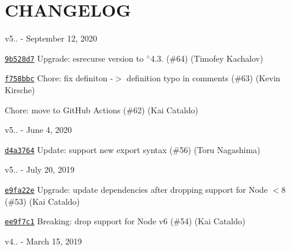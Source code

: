 \chapter{CHANGELOG}
\hypertarget{md_node__modules_2webpack_2node__modules_2eslint-scope_2CHANGELOG}{}\label{md_node__modules_2webpack_2node__modules_2eslint-scope_2CHANGELOG}
v5.. -\/ September 12, 2020


\begin{DoxyItemize}
\item \href{https://github.com/eslint/eslint-scope/commit/9b528d778c381718c12dabfb7f1c0e0dc6b36e49}{\texttt{ {\ttfamily 9b528d7}}} Upgrade\+: esrecurse version to \texorpdfstring{$^\wedge$}{\string^}4.3. (\#64) (Timofey Kachalov)
\item \href{https://github.com/eslint/eslint-scope/commit/f758bbc3d49b9b9ea2289a5d6a6bba8dcf2c4903}{\texttt{ {\ttfamily f758bbc}}} Chore\+: fix definiton -\/\texorpdfstring{$>$}{>} definition typo in comments (\#63) (Kevin Kirsche)
\item \href{https://github.com/eslint/eslint-scope/commit/751373473375b3f2edc4eaf1c8d2763d8435bb72}{\texttt{ {}}} Chore\+: move to Git\+Hub Actions (\#62) (Kai Cataldo)
\end{DoxyItemize}

v5.. -\/ June 4, 2020


\begin{DoxyItemize}
\item \href{https://github.com/eslint/eslint-scope/commit/d4a376434b16289c1a428d7e304576e997520873}{\texttt{ {\ttfamily d4a3764}}} Update\+: support new export syntax (\#56) (Toru Nagashima)
\end{DoxyItemize}

v5.. -\/ July 20, 2019


\begin{DoxyItemize}
\item \href{https://github.com/eslint/eslint-scope/commit/e9fa22ea412c26cf2761fa98af7e715644bdb464}{\texttt{ {\ttfamily e9fa22e}}} Upgrade\+: update dependencies after dropping support for Node \texorpdfstring{$<$}{<}8 (\#53) (Kai Cataldo)
\item \href{https://github.com/eslint/eslint-scope/commit/ee9f7c12721aa195ba7e0e69551f49bfdb479951}{\texttt{ {\ttfamily ee9f7c1}}} Breaking\+: drop support for Node v6 (\#54) (Kai Cataldo)
\end{DoxyItemize}

v4.. -\/ March 15, 2019


